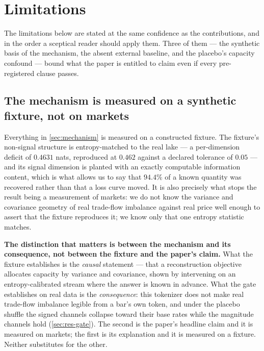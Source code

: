 \section{Limitations}
\label{sec:limitations}

The limitations below are stated at the same confidence as the contributions, and in the order a
sceptical reader should apply them. Three of them --- the synthetic basis of the mechanism, the
absent external baseline, and the placebo's capacity confound --- bound what the paper is entitled
to claim even if every pre-registered clause passes.

\subsection{The mechanism is measured on a synthetic fixture, not on markets}
\label{sec:lim-fixture}

Everything in \cref{sec:mechanism} is measured on a constructed fixture. The fixture's non-signal
structure is entropy-matched to the real lake --- a per-dimension deficit of $0.4631$ nats,
reproduced at $0.462$ against a declared tolerance of $0.05$ --- and its signal dimension is
planted with an exactly computable information content, which is what allows us to say that
$94.4\%$ of a known quantity was recovered rather than that a loss curve moved. It is also
precisely what stops the result being a measurement of markets: we do not know the variance and
covariance geometry of real trade-flow imbalance against real price well enough to assert that the
fixture reproduces it; we know only that one entropy statistic matches.

\textbf{The distinction that matters is between the mechanism and its consequence, not between the
fixture and the paper's claim.} What the fixture establishes is the \emph{causal} statement --- that
a reconstruction objective allocates capacity by variance and covariance, shown by intervening on
an entropy-calibrated stream where the answer is known in advance. What the gate establishes on
real data is the \emph{consequence}: this tokenizer does not make real trade-flow imbalance legible
from a bar's own token, and under the placebo shuffle the signed channels collapse toward their
base rates while the magnitude channels hold (\cref{sec:res-gate}). The second is the paper's
headline claim and it is measured on markets; the first is its explanation and it is measured on a
fixture. Neither substitutes for the other.

